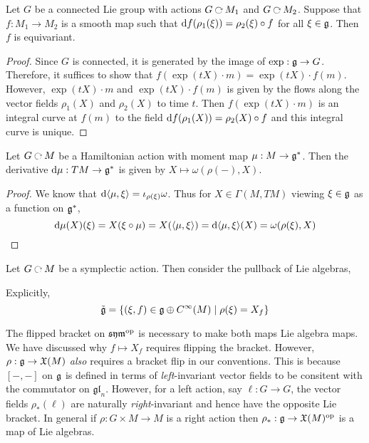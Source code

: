 \documentclass[12pt]{extarticle}
\begin{document}
\begin{lemma}
Let $G$ be a connected Lie group with actions $G \acts M_1$ and $G \acts M_2$. Suppose that $f : M_1 \to M_2$ is a smooth map such that $\mathrm{d}{f}(\rho_1(\xi)) = \rho_2(\xi) \circ f$ for all $\xi \in \mathfrak{g}$. Then $f$ is equivariant.
\end{lemma}

\begin{proof}
Since $G$ is connected, it is generated by the image of $\exp : \mathfrak{g} \to G$. Therefore, it suffices to show that $f(\exp{(t X)} \cdot m) = \exp{(t X)} \cdot f(m)$. However, $\exp{(t X)} \cdot m$ and $\exp{(t X)} \cdot f(m)$ is given by the flows along the vector fields $\rho_1(X)$ and $\rho_2(X)$ to time $t$. Then $f(\exp{(t X)} \cdot m)$ is an integral curve at $f(m)$ to the field $\mathrm{d}{f}(\rho_1(X)) = \rho_2(X) \circ f$ and this integral curve is unique. 
\end{proof}

\begin{lemma}
Let $G \acts M$ be a Hamiltonian action with moment map $\mu : M \to \mathfrak{g}^*$. Then the derivative $\mathrm{d}{\mu} : TM \to \mathfrak{g}^*$ is given by $X \mapsto \omega(\rho(-), X)$.
\end{lemma}

\begin{proof}
We know that $\mathrm{d}{\left< \mu , \xi \right>} = \iota_{\rho(\xi)} \omega$. Thus for $X \in \Gamma(M, TM)$ viewing $\xi \in \mathfrak{g}$ as a function on $\mathfrak{g}^*$,
\[ \mathrm{d}{\mu}(X)(\xi) = X(\xi \circ \mu) = X(\left< \mu , \xi \right>) = \mathrm{d}{\left< \mu , \xi \right>}(X) = \omega(\rho(\xi), X) \]
\end{proof}


\begin{defn}
Let $G \acts M$ be a symplectic action. Then consider the pullback of Lie algebras,
\begin{center}
\end{center}
Explicitly,
\[ \tilde{\mathfrak{g}} = \{(\xi, f) \in \mathfrak{g} \oplus C^{\infty}(M) \mid \rho(\xi) = X_f \} \]
\end{defn}

\begin{rmk}
The flipped bracket on $\mathfrak{sym}^{\mathrm{op}}$ is necessary to make both maps Lie algebra maps. We have discussed why $f \mapsto X_f$ requires flipping the bracket. However, $\rho : \mathfrak{g} \to \mathfrak{X}(M)$ \textit{also} requires a bracket flip in our conventions. This is because $[-,-]$ on $\mathfrak{g}$ is defined in terms of \textit{left}-invariant vector fields to be consitent with the commutator on $\mathfrak{gl}_n$. However, for a left action, say $\ell : G \to G$, the vector fields $\rho_*(\ell)$ are naturally \textit{right}-invariant and hence have the opposite Lie bracket. In general if $\rho : G \times M \to M$ is a right action then $\rho_* : \mathfrak{g} \to \mathfrak{X}(M)^{\mathrm{op}}$ is a map of Lie algebras.
\end{rmk}
\end{document}
